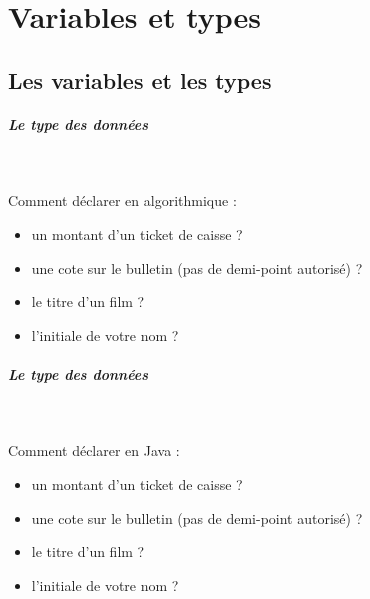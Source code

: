 \documentclass[11pt,a4paper]{article}
\begin{document}
            \section{Variables et types}\subsection{Les variables et les types}
			
		\subparagraph{Le type des donn\'ees} 
		
                \textcolor{white}{.} \par
             
								Comment d\'eclarer en algorithmique :
							
					\begin{itemize}
				
			\item un montant d'un ticket de caisse ?  \textcolor{gray}{\underline{\hspace*{10em}}} 
			\item une cote sur le bulletin (pas de demi-point autoris\'e) ?  \textcolor{gray}{\underline{\hspace*{10em}}} 
			\item le titre d'un film ?  \textcolor{gray}{\underline{\hspace*{10em}}} 
			\item l'initiale de votre nom ?  \textcolor{gray}{\underline{\hspace*{10em}}} 
					\end{itemize}
				
			
		\subparagraph{Le type des donn\'ees} 
		
                \textcolor{white}{.} \par
             
								Comment d\'eclarer en Java :
							
					\begin{itemize}
				
			\item un montant d'un ticket de caisse ?  \textcolor{gray}{\underline{\hspace*{10em}}} 
			\item une cote sur le bulletin (pas de demi-point autoris\'e) ?  \textcolor{gray}{\underline{\hspace*{10em}}} 
			\item le titre d'un film ?  \textcolor{gray}{\underline{\hspace*{10em}}} 
			\item l'initiale de votre nom ?  \textcolor{gray}{\underline{\hspace*{10em}}} 
					\end{itemize}
				
\end{document}
